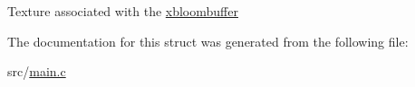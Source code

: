 Texture associated with the \mbox{\hyperlink{structSystem_1_1System__Window_a1b17d691077fc954bdfe68e7a178909f}{xbloombuffer}} 

The documentation for this struct was generated from the following file\+:\begin{DoxyCompactItemize}
\item 
src/\mbox{\hyperlink{main_8c}{main.\+c}}\end{DoxyCompactItemize}
